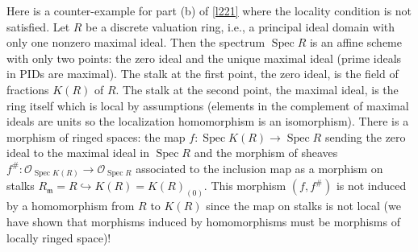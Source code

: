 \documentclass[12pt,letter]{article}
\newcommand{\Spec}[0]{\operatorname{Spec}}
\begin{document}
	Here is a counter-example for part (b) of \autoref{l221} where the locality condition is not satisfied. Let $R$ be a discrete valuation ring, i.e., a principal ideal domain with only one nonzero maximal ideal. Then the spectrum $\Spec R$ is an affine scheme with only two points: the zero ideal and the unique maximal ideal (prime ideals in PIDs are maximal). The stalk at the first point, the zero ideal, is the field of fractions $K(R)$ of $R$. The stalk at the second point, the maximal ideal, is the ring itself which is local by assumptions (elements in the complement of maximal ideals are units so the localization homomorphism is an isomorphism). There is a morphism of ringed spaces: the map $f:\Spec K(R)\to \Spec R$ sending the zero ideal to the maximal ideal in $\Spec R$ and the morphism of sheaves $f^\#: \mathscr O_{\Spec K(R)}\to\mathscr O_{\Spec R}$ associated to the inclusion map as a morphism on stalks $R_{\mathfrak m}=R\hookrightarrow K(R)=K(R)_{(0)}$. This morphism $(f, f^\#)$ is not induced by a homomorphism from $R$ to $K(R)$ since the map on stalks is not local (we have shown that morphisms induced by homomorphisms must be morphisms of locally ringed space)!
\end{document}

